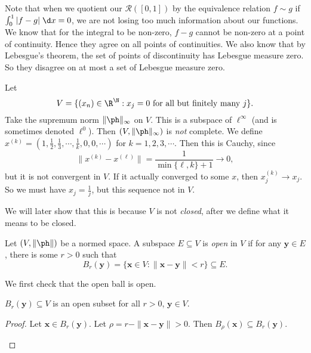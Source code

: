 \documentclass[a4paper]{article}
\begin{document}
Note that when we quotient our $\mathcal{R}([0, 1])$ by the equivalence relation $f\sim g$ if $\int_0^1 |f - g|\;\d x = 0$, we are not losing too much information about our functions. We know that for the integral to be non-zero, $f - g$ cannot be non-zero at a point of continuity. Hence they agree on all points of continuities. We also know that by Lebesgue's theorem, the set of points of discontinuity has Lebesgue measure zero. So they disagree on at most a set of Lebesgue measure zero.

\begin{eg}
  Let
  \[
    V = \{(x_n) \in \R^\N: x_j = 0\text{ for all but finitely many }j\}.
  \]
  Take the supremum norm $\|\ph\|_\infty$ on $V$. This is a subspace of $\ell^\infty$ (and is sometimes denoted $\ell^0$). Then $(V, \|\ph\|_\infty)$ is \emph{not} complete. We define $x^{(k)} = (1, \frac{1}{2}, \frac{1}{3}, \cdots, \frac{1}{k}, 0, 0, \cdots)$ for $k = 1, 2, 3, \cdots$. Then this is Cauchy, since
  \[
    \|x^{(k)} - x^{(\ell)}\| = \frac{1}{\min\{\ell, k\} + 1} \to 0,
  \]
  but it is not convergent in $V$. If it actually converged to some $x$, then $x^{(k)}_j \to x_j$. So we must have $x_j = \frac{1}{j}$, but this sequence not in $V$.

  We will later show that this is because $V$ is not \emph{closed}, after we define what it means to be closed.
\end{eg}

\begin{defi}
  Let $(V, \|\ph\|)$ be a normed space. A subspace $E\subseteq V$ is \emph{open} in $V$ if for any $\mathbf{y} \in E$, there is some $r > 0$ such that
  \[
    B_r(\mathbf{y}) = \{\mathbf{x}\in V: \|\mathbf{x} - \mathbf{y}\| < r\} \subseteq E.
  \]
\end{defi}

We first check that the open ball is open.
\begin{prop}
  $B_r(\mathbf{y})\subseteq V$ is an open subset for all $r > 0$, $\mathbf{y} \in V$.
\end{prop}

\begin{proof}
  Let $\mathbf{x} \in B_r(\mathbf{y})$. Let $\rho = r - \|\mathbf{x} - \mathbf{y}\| > 0$. Then $B_\rho(\mathbf{x}) \subseteq B_r(\mathbf{y})$.
  \begin{center}
  \end{center}
\end{proof}
\end{document}
